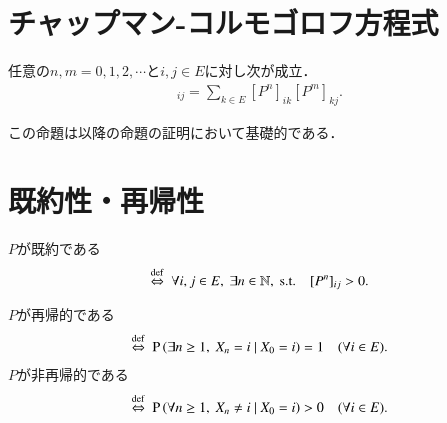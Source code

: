 \section{チャップマン-コルモゴロフ方程式}
	\begin{prp}
		任意の$n,m = 0,1,2,\cdots$と$i,j \in E$に対し次が成立．
		\begin{align}
			[P^{n+m}]_{ij} = \sum_{k \in E}[P^n]_{ik}[P^m]_{kj}. 
		\end{align}
	\end{prp}
	
	この命題は以降の命題の証明において基礎的である．

\section{既約性・再帰性}
	\begin{dfn}[既約性]
		$P$が既約である
		\begin{align}
			\overset{\mathrm{def}}{\Leftrightarrow}\ \forall i, j \in E,\ \exists n \in \mathbb{N},\ \mathrm{s.t. \quad} [P^n]_{ij} > 0.
		\end{align}
	\end{dfn}
	\begin{dfn}[再帰性]
		$P$が再帰的である
		\begin{align}
			\overset{\mathrm{def}}{\Leftrightarrow}\ \operatorname{P} \left( \exists n \geq 1,\ X_n = i \ \middle|\ X_0 = i \right) = 1 \quad(\forall i \in E).
		\end{align}
		$P$が非再帰的である
		\begin{align}
			\overset{\mathrm{def}}{\Leftrightarrow}\ \operatorname{P} \left( \forall n \geq 1,\ X_n \neq i \ \middle|\ X_0 = i \right) > 0 \quad(\forall i \in E).
		\end{align}
	\end{dfn}
	
